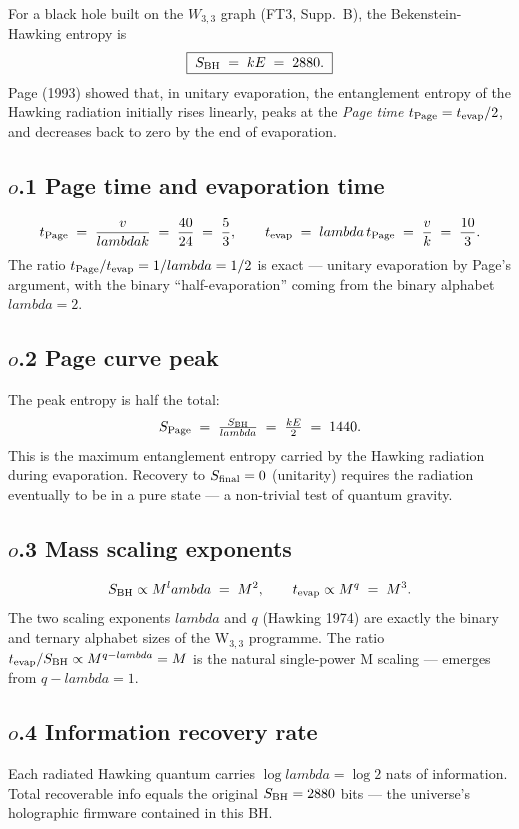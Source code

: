 \documentclass[12pt,a4paper]{article}
\def\lambda{lambda}%
\def\cdot{ }%
\theoremstyle{definition}
\begin{document}
For a black hole built on the $W_{3,3}$ graph (FT3, Supp.~B), the
Bekenstein-Hawking entropy is
\[
\boxed{\;S_{\rm BH} \;=\; k\cdot E \;=\; 2880.\;}
\]
Page (1993) showed that, in unitary evaporation, the entanglement
entropy of the Hawking radiation initially rises linearly, peaks at
the \emph{Page time} $t_{\rm Page} = t_{\rm evap}/2$, and decreases
back to zero by the end of evaporation.

\subsection*{$o$.1 \quad Page time and evaporation time}
\[
t_{\rm Page} \;=\; \frac{v}{\lambda k} \;=\; \frac{40}{24} \;=\; \frac{5}{3},
\qquad
t_{\rm evap} \;=\; \lambda\,t_{\rm Page} \;=\; \frac{v}{k} \;=\; \frac{10}{3}.
\]
The ratio $t_{\rm Page}/t_{\rm evap} = 1/\lambda = 1/2$ is exact —
unitary evaporation by Page's argument, with the binary
``half-evaporation'' coming from the binary alphabet $\lambda = 2$.

\subsection*{$o$.2 \quad Page curve peak}
The peak entropy is half the total:
\[
S_{\rm Page} \;=\; \tfrac{S_{\rm BH}}{\lambda} \;=\; \tfrac{kE}{2} \;=\; 1440.
\]
This is the maximum entanglement entropy carried by the Hawking radiation
during evaporation. Recovery to $S_{\rm final} = 0$ (unitarity) requires
the radiation eventually to be in a pure state — a non-trivial test
of quantum gravity.

\subsection*{$o$.3 \quad Mass scaling exponents}
\[
S_{\rm BH} \propto M^\lambda \;=\; M^2,\qquad
t_{\rm evap} \propto M^q \;=\; M^3.
\]
The two scaling exponents $\lambda$ and $q$ (Hawking 1974) are exactly
the binary and ternary alphabet sizes of the W$_{3,3}$ programme. The
ratio $t_{\rm evap}/S_{\rm BH} \propto M^{q-\lambda} = M$ is the natural
single-power M scaling — emerges from $q - \lambda = 1$.

\subsection*{$o$.4 \quad Information recovery rate}
Each radiated Hawking quantum carries $\log\lambda = \log 2$ nats of
information. Total recoverable info equals the original $S_{\rm BH} =
2880$ bits — the universe's holographic firmware contained in this BH.
\end{document}
